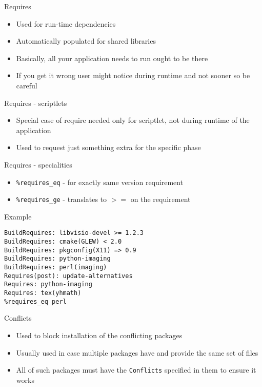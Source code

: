 \documentclass{beamer}
\begin{document}
\begin{frame}[t]{Requires}
	\begin{itemize}
    \item Used for run-time dependencies
    \item Automatically populated for shared libraries
    \item Basically, all your application needs to run ought to be there
    \item If you get it wrong user might notice during runtime and not sooner so be careful
	\end{itemize}
\end{frame}

\begin{frame}[t]{Requires - scriptlets}
	\begin{itemize}
	\item Special case of require needed only for scriptlet, not during runtime of the application
    \item Used to request just something extra for the specific phase
	\end{itemize}
\end{frame}

\begin{frame}[t]{Requires - specialities}
	\begin{itemize}
    \item \texttt{\%requires\_eq} - for exactly same version requirement
    \item \texttt{\%requires\_ge} - translates to $>=$ on the requirement
	\end{itemize}
\end{frame}

\begin{frame}[fragile]{Example}
	\begin{small}
\begin{verbatim}
BuildRequires: libvisio-devel >= 1.2.3
BuildRequires: cmake(GLEW) < 2.0
BuildRequires: pkgconfig(X11) => 0.9
BuildRequires: python-imaging
BuildRequires: perl(imaging)
Requires(post): update-alternatives
Requires: python-imaging
Requires: tex(yhmath)
%requires_eq perl
\end{verbatim}
	\end{small}
\end{frame}

\begin{frame}[t]{Conflicts}
	\begin{itemize}
    \item Used to block installation of the conflicting packages
    \item Usually used in case multiple packages have and provide the same set of files
    \item All of such packages must have the \texttt{Conflicts} specified in them to ensure it works
	\end{itemize}
\end{frame}
\end{document}
